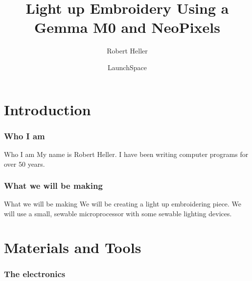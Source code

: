 \documentclass{beamer}
\title{Light up Embroidery Using a Gemma M0 and NeoPixels}
\author{Robert Heller}
\date{LaunchSpace}
\begin{document}
\frame{\titlepage}

\part{Introduction}

\section{Who I am}
\begin{frame}[fragile]{Who I am}
My name is Robert Heller.  I have been writing computer programs for over 50
years.
\end{frame}
\section{What we will be making}
\begin{frame}[fragile]{What we will be making}
We will be creating a light up embroidering piece.  We will use a small, 
sewable microprocessor with some sewable lighting devices.
\end{frame}
\part{Materials and Tools}

\section{The electronics}
\frame{\tableofcontents[hideothersubsections,sectionstyle=show/hide]}
\end{document}
